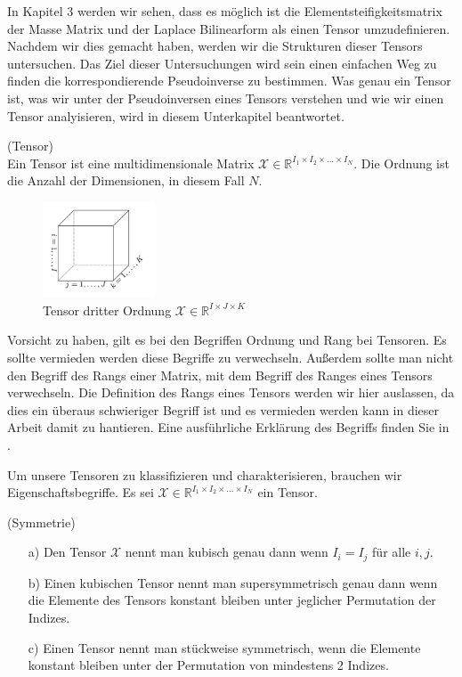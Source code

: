 In Kapitel 3 werden wir sehen, dass es möglich ist die Elementsteifigkeitsmatrix der Masse Matrix und der Laplace Bilinearform als einen Tensor umzudefinieren. Nachdem wir dies gemacht haben, werden wir die Strukturen dieser Tensors untersuchen. Das Ziel dieser Untersuchungen wird sein einen einfachen Weg zu finden die korrespondierende Pseudoinverse zu bestimmen. Was genau ein Tensor ist, was wir unter der Pseudoinversen eines Tensors verstehen und wie wir einen Tensor analyisieren, wird in diesem Unterkapitel beantwortet.


\begin{Definition} (Tensor) \\
Ein Tensor ist eine multidimensionale Matrix $\pmb{\mathscr{X}}  \in \mathbb{R}^{I_1 \times I_2 \times \dots \times I_N}$.
Die Ordnung ist die Anzahl der Dimensionen, in diesem Fall $N$. 
\end{Definition}

\begin{figure}[ht]
	\centering
  \includegraphics[width=0.3\textwidth]{tensorOrdnung3.png}
	\caption{Tensor dritter Ordnung $\pmb{\mathscr{X}}  \in \mathbb{R}^{I \times J \times K}$ \cite[456]{Kolda}}
	\label{fig:tensorOrdnung3}
\end{figure}

Vorsicht zu haben, gilt es bei den Begriffen Ordnung und Rang bei Tensoren. Es sollte vermieden werden diese Begriffe zu verwechseln. Außerdem sollte man nicht den Begriff des Rangs einer Matrix, mit dem Begriff des Ranges eines Tensors verwechseln. Die Definition des Rangs eines Tensors werden wir hier auslassen, da dies ein überaus schwieriger Begriff ist und es vermieden werden kann in dieser Arbeit damit zu hantieren. Eine ausführliche Erklärung des Begriffs finden Sie in \cite[464]{Kolda}.

\newpage

Um unsere Tensoren zu klassifizieren und charakterisieren, brauchen wir Eigenschaftsbegriffe. Es sei $\pmb{\mathscr{X}}  \in \mathbb{R}^{I_1 \times I_2 \times \dots \times I_N}$ ein Tensor.
\begin{Definition} (Symmetrie)
\begin{itemize}
\item[a)] Den Tensor $\pmb{\mathscr{X}}$ nennt man kubisch genau dann wenn $I_i = I_j$ für alle $i,j$.
\item[b)] Einen kubischen Tensor nennt man supersymmetrisch genau dann wenn die Elemente des Tensors konstant bleiben unter jeglicher Permutation der Indizes.
\item[c)] Einen Tensor nennt man stückweise symmetrisch, wenn die Elemente konstant bleiben unter der Permutation von mindestens 2 Indizes.
\end{itemize}
\end{Definition}

